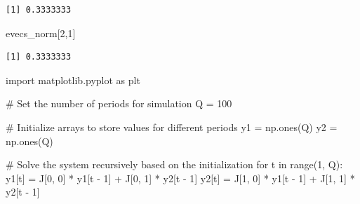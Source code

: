 \documentclass[
  letterpaper,
  DIV=11,
  numbers=noendperiod]{scrreprt}
\newenvironment{Shaded}{\begin{snugshade}}{\end{snugshade}}
\newcommand{\BuiltInTok}[1]{\textcolor[rgb]{0.00,0.23,0.31}{#1}}
\newcommand{\CommentTok}[1]{\textcolor[rgb]{0.37,0.37,0.37}{#1}}
\newcommand{\ControlFlowTok}[1]{\textcolor[rgb]{0.00,0.23,0.31}{#1}}
\newcommand{\DecValTok}[1]{\textcolor[rgb]{0.68,0.00,0.00}{#1}}
\newcommand{\ImportTok}[1]{\textcolor[rgb]{0.00,0.46,0.62}{#1}}
\newcommand{\KeywordTok}[1]{\textcolor[rgb]{0.00,0.23,0.31}{#1}}
\newcommand{\NormalTok}[1]{\textcolor[rgb]{0.00,0.23,0.31}{#1}}
\newcommand{\OperatorTok}[1]{\textcolor[rgb]{0.37,0.37,0.37}{#1}}
\begin{document}
\begin{verbatim}
[1] 0.3333333
\end{verbatim}

\begin{Shaded}
\begin{Highlighting}[]
\NormalTok{evecs\_norm[}\DecValTok{2}\NormalTok{,}\DecValTok{1}\NormalTok{]}
\end{Highlighting}
\end{Shaded}

\begin{verbatim}
[1] 0.3333333
\end{verbatim}

\begin{tcolorbox}[enhanced jigsaw, titlerule=0mm, breakable, bottomrule=.15mm, toprule=.15mm, colbacktitle=quarto-callout-note-color!10!white, rightrule=.15mm, toptitle=1mm, opacityback=0, left=2mm, coltitle=black, title=\textcolor{quarto-callout-note-color}{\faInfo}\hspace{0.5em}{Python code}, colframe=quarto-callout-note-color-frame, opacitybacktitle=0.6, leftrule=.75mm, bottomtitle=1mm, arc=.35mm, colback=white]

\begin{Shaded}
\begin{Highlighting}[]
\ImportTok{import}\NormalTok{ matplotlib.pyplot }\ImportTok{as}\NormalTok{ plt}

\CommentTok{\# Set the number of periods for simulation}
\NormalTok{Q }\OperatorTok{=} \DecValTok{100}

\CommentTok{\# Initialize arrays to store values for different periods}
\NormalTok{y1 }\OperatorTok{=}\NormalTok{ np.ones(Q)}
\NormalTok{y2 }\OperatorTok{=}\NormalTok{ np.ones(Q)}

\CommentTok{\# Solve the system recursively based on the initialization}
\ControlFlowTok{for}\NormalTok{ t }\KeywordTok{in} \BuiltInTok{range}\NormalTok{(}\DecValTok{1}\NormalTok{, Q):}
\NormalTok{    y1[t] }\OperatorTok{=}\NormalTok{ J[}\DecValTok{0}\NormalTok{, }\DecValTok{0}\NormalTok{] }\OperatorTok{*}\NormalTok{ y1[t }\OperatorTok{{-}} \DecValTok{1}\NormalTok{] }\OperatorTok{+}\NormalTok{ J[}\DecValTok{0}\NormalTok{, }\DecValTok{1}\NormalTok{] }\OperatorTok{*}\NormalTok{ y2[t }\OperatorTok{{-}} \DecValTok{1}\NormalTok{]}
\NormalTok{    y2[t] }\OperatorTok{=}\NormalTok{ J[}\DecValTok{1}\NormalTok{, }\DecValTok{0}\NormalTok{] }\OperatorTok{*}\NormalTok{ y1[t }\OperatorTok{{-}} \DecValTok{1}\NormalTok{] }\OperatorTok{+}\NormalTok{ J[}\DecValTok{1}\NormalTok{, }\DecValTok{1}\NormalTok{] }\OperatorTok{*}\NormalTok{ y2[t }\OperatorTok{{-}} \DecValTok{1}\NormalTok{]}


\end{Highlighting}
\end{Shaded}
\end{tcolorbox}
\end{document}
